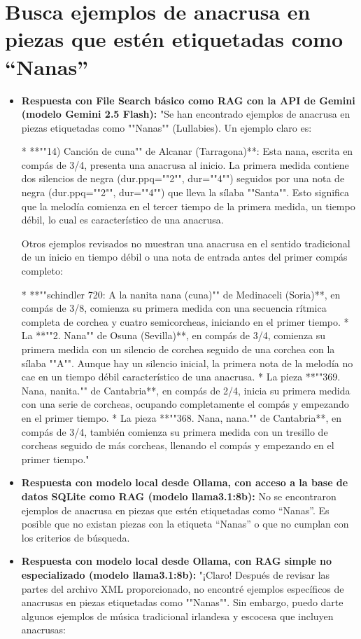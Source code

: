 \section{Busca ejemplos de anacrusa en piezas que estén etiquetadas como ``Nanas''}
\begin{itemize}
    \item \textbf{Respuesta con File Search básico como RAG con la API de Gemini (modelo Gemini 2.5 Flash):} "Se han encontrado ejemplos de anacrusa en piezas etiquetadas como ""Nanas"" (Lullabies). Un ejemplo claro es:

*   **""14) Canción de cuna"" de Alcanar (Tarragona)**: Esta nana, escrita en compás de 3/4, presenta una anacrusa al inicio. La primera medida contiene dos silencios de negra (dur.ppq=""2"", dur=""4"") seguidos por una nota de negra (dur.ppq=""2"", dur=""4"") que lleva la sílaba ""Santa"". Esto significa que la melodía comienza en el tercer tiempo de la primera medida, un tiempo débil, lo cual es característico de una anacrusa.

Otros ejemplos revisados no muestran una anacrusa en el sentido tradicional de un inicio en tiempo débil o una nota de entrada antes del primer compás completo:

*   **""schindler 720: A la nanita nana (cuna)"" de Medinaceli (Soria)**, en compás de 3/8, comienza su primera medida con una secuencia rítmica completa de corchea y cuatro semicorcheas, iniciando en el primer tiempo.
*   La **""2. Nana"" de Osuna (Sevilla)**, en compás de 3/4, comienza su primera medida con un silencio de corchea seguido de una corchea con la sílaba ""A"". Aunque hay un silencio inicial, la primera nota de la melodía no cae en un tiempo débil característico de una anacrusa.
*   La pieza **""369. Nana, nanita."" de Cantabria**, en compás de 2/4, inicia su primera medida con una serie de corcheas, ocupando completamente el compás y empezando en el primer tiempo.
*   La pieza **""368. Nana, nana."" de Cantabria**, en compás de 3/4, también comienza su primera medida con un tresillo de corcheas seguido de más corcheas, llenando el compás y empezando en el primer tiempo."
    \item \textbf{Respuesta con modelo local desde Ollama, con acceso a la base de datos SQLite como RAG (modelo llama3.1:8b):} No se encontraron ejemplos de anacrusa en piezas que estén etiquetadas como ``Nanas''. Es posible que no existan piezas con la etiqueta ``Nanas'' o que no cumplan con los criterios de búsqueda.
    \item \textbf{Respuesta con modelo local desde Ollama, con RAG simple no especializado (modelo llama3.1:8b):} "¡Claro! Después de revisar las partes del archivo XML proporcionado, no encontré ejemplos específicos de anacrusas en piezas etiquetadas como ""Nanas"". Sin embargo, puedo darte algunos ejemplos de música tradicional irlandesa y escocesa que incluyen anacrusas:


\end{itemize}
